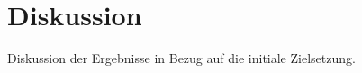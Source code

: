 \section{Diskussion}
\label{Diskussion}

Diskussion der Ergebnisse in Bezug auf die initiale Zielsetzung.